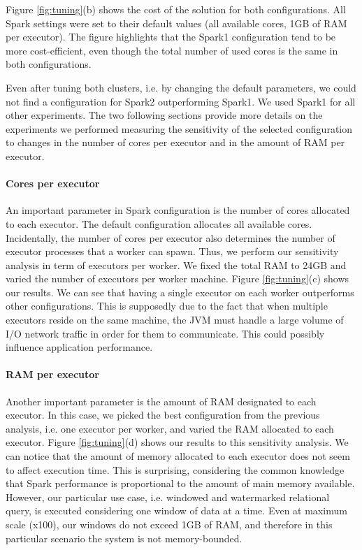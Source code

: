 {Figure \ref{fig:tuning}(b) shows the cost of the solution for both configurations. All Spark settings were set to their default values (all available cores, 1GB of RAM per executor).  The figure highlights that the Spark1 configuration tend to be more cost-efficient, even though the total number of used cores is the same in both configurations.

Even after tuning both clusters, i.e. by changing the default parameters, we could not find a configuration for Spark2 outperforming Spark1. We used Spark1 for all other experiments. The two following sections provide more details on the experiments we performed measuring the sensitivity of the selected configuration to changes in the number of cores per executor and in the amount of RAM per executor.

\paragraph{Cores per executor} An important parameter in Spark configuration is the number of cores allocated to each executor. The default configuration allocates all available cores. Incidentally, the number of cores per executor also determines the number of executor processes that a worker can spawn. Thus, we perform our sensitivity analysis in term of executors per worker. We fixed the total RAM to 24GB and varied the number of executors per worker machine. Figure \ref{fig:tuning}(c) shows our results. We can see that having a single executor on each worker outperforms other configurations. This is supposedly due to the fact that when multiple executors reside on the same machine, the JVM must handle a large volume of I/O network traffic in order for them to communicate. This could possibly influence application performance.

\paragraph{RAM per executor} Another important parameter is the amount of RAM designated to each executor. In this case, we picked the best configuration from the previous analysis, i.e. one executor per worker, and varied the RAM allocated to each executor. Figure \ref{fig:tuning}(d) shows our results to this sensitivity analysis. We can notice that the amount of memory allocated to each executor does not seem to affect execution time. This is surprising, considering the common knowledge that Spark performance is proportional to the amount of main memory available. However, our particular use case, i.e. windowed and watermarked relational query, is executed considering one window of data at a time. Even at maximum scale (x100), our windows do not exceed 1GB of RAM, and therefore in this particular scenario the system is not memory-bounded.

}
